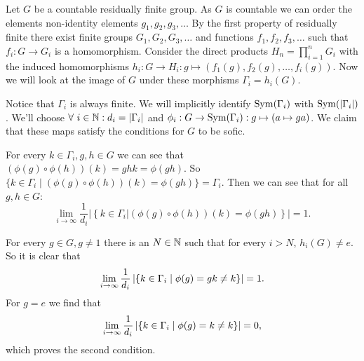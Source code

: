 Let $G$ be a countable residually finite group. As $G$ is countable we can order the elements non-identity elements $g_1, g_2, g_3, \dots$
By the first property of residually finite there exist finite groups $G_1, G_2, G_3, \dots$ and functions $f_1, f_2, f_3, \dots$ such that $f_i: G \to G_i$ is a homomorphism. Consider the direct products $H_n = \prod_{i = 1}^n G_i$ with the induced homomorphisms $h_i: G \to H_i: g \mapsto (f_1(g), f_2(g), \dots, f_i(g))$. Now we will look at the image of $G$ under these morphisms $\Gamma_i = h_i(G)$.


Notice that $\Gamma_i$ is always finite. We will implicitly identify $\operatorname{Sym}(\Gamma_i)$ with $\operatorname{Sym}(\left| \Gamma_i \right|)$.
We'll choose $\forall\ i \in \mathbb{N}: d_i = \left| \Gamma_i \right|$ and $\phi_i: G \to \operatorname{Sym}(\Gamma_i): g \mapsto (a \mapsto ga)$. We claim that these maps satisfy the conditions for $G$ to be sofic.

For every $k \in \Gamma_i, g, h \in G$ we can see that $(\phi(g) \circ \phi(h))(k) = ghk = \phi(gh)$. So $\{k \in \Gamma_i \mid (\phi(g) \circ \phi(h))(k) = \phi(gh)\} = \Gamma_i$.
Then we can see that for all $g,h \in G$:
$$\lim_{i\to \infty} \frac{1}{d_i} \left|\left\{k \in \Gamma_i| (\phi(g) \circ \phi(h))(k) = \phi(gh)\right\}\right| = 1.$$

For every $g \in G, g\ne 1$ there is an $N \in \mathbb{N}$ such that for every $i > N$, $h_i(G) \ne e$. So it is clear that 
$$\lim_{i \to \infty} \frac{1}{d_i} \left| \left\{k \in \Gamma_i \mid \phi(g) = gk \ne k\right\} \right| = 1.$$
For $g = e$ we find that 
$$\lim_{i \to \infty} \frac{1}{d_i} \left| \left\{k \in \Gamma_i \mid \phi(g) = k \ne k\right\} \right| = 0,$$
which proves the second condition. 
